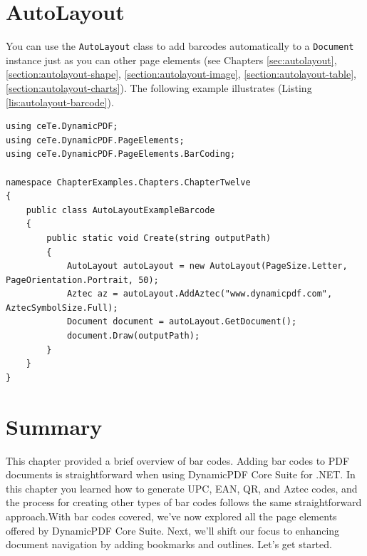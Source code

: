 \documentclass[american]{tufte-book}
\numberwithin{equation}{section}
\numberwithin{figure}{section}
\def\color#1{}%
\begin{document}
{\section{AutoLayout}
\label{section:autolayout-barcode}
You can use the \texttt{AutoLayout} class to add barcodes automatically to a \texttt{Document} instance just as you can other page elements (see Chapters \ref{sec:autolayout}, \ref{section:autolayout-shape}, \ref{section:autolayout-image}, \ref{section:autolayout-table}, \ref{section:autolayout-charts}). The following example illustrates (Listing \ref{lis:autolayout-barcode}).

\bgroup{}
\begin{lstlisting}[caption={Using AutoLayout to create a PDF document.},label={lis:autolayout-barcode},basicstyle={\footnotesize\ttfamily},breaklines=true]
using ceTe.DynamicPDF;
using ceTe.DynamicPDF.PageElements;
using ceTe.DynamicPDF.PageElements.BarCoding;

namespace ChapterExamples.Chapters.ChapterTwelve
{
    public class AutoLayoutExampleBarcode
    {
        public static void Create(string outputPath)
        {
            AutoLayout autoLayout = new AutoLayout(PageSize.Letter, PageOrientation.Portrait, 50);
            Aztec az = autoLayout.AddAztec("www.dynamicpdf.com", AztecSymbolSize.Full);
            Document document = autoLayout.GetDocument();
            document.Draw(outputPath);
        }
    }
}
\end{lstlisting}
\leavevmode\egroup

\section{Summary}

This chapter provided a brief overview of bar codes. Adding bar codes to PDF documents is straightforward when using DynamicPDF Core Suite for .NET. In this chapter you learned how to generate UPC, EAN, QR, and Aztec codes, and the process for creating other types of bar codes follows the same straightforward approach.With bar codes covered, we've now explored all the page elements offered by DynamicPDF Core Suite. Next, we’ll shift our focus to enhancing document navigation by adding bookmarks and outlines. Let’s get started.

\color{white}
}
\end{document}
